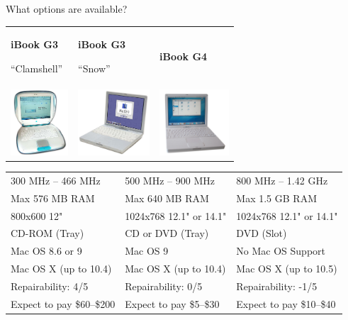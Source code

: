 \documentclass{lug}
\begin{document}
\begin{frame}{What options are available?}
    \small

    \begin{tabular}{ >{\centering\arraybackslash}m{} >{\centering\arraybackslash}m{} >{\centering\arraybackslash}m{} }

        \textbf{iBook G3}\par ``Clamshell'' &
        \textbf{iBook G3}\par ``Snow'' &
        \textbf{iBook G4} \\[10pt]

        \includegraphics[height=70pt]{graphics/clamshell.jpg} &
        \includegraphics[height=70pt]{graphics/ibooksnow.jpg} &
        \includegraphics[height=70pt]{graphics/g4.jpg} \\
    \end{tabular}

    \pause

    \scriptsize
    \begin{tabular}{ p{} p{} p{} }
         300 MHz -- 466 MHz        & 500 MHz -- 900 MHz      & 800 MHz -- 1.42 GHz      \\
         Max 576 MB RAM            & Max 640 MB RAM          & Max 1.5 GB RAM           \\
         800x600 12"               & 1024x768 12.1" or 14.1" & 1024x768 12.1" or 14.1"  \\
         CD-ROM (Tray)             & CD or DVD (Tray)        & DVD (Slot)               \\
         Mac OS 8.6 or 9           & Mac OS 9                & No Mac OS Support        \\
         Mac OS X (up to 10.4)     & Mac OS X (up to 10.4)   & Mac OS X (up to 10.5)    \\
         Repairability: 4/5        & Repairability: 0/5      & Repairability: -1/5      \\
         Expect to pay \$60--\$200 & Expect to pay \$5--\$30 & Expect to pay \$10--\$40 \\
    \end{tabular}


\end{frame}
\end{document}
